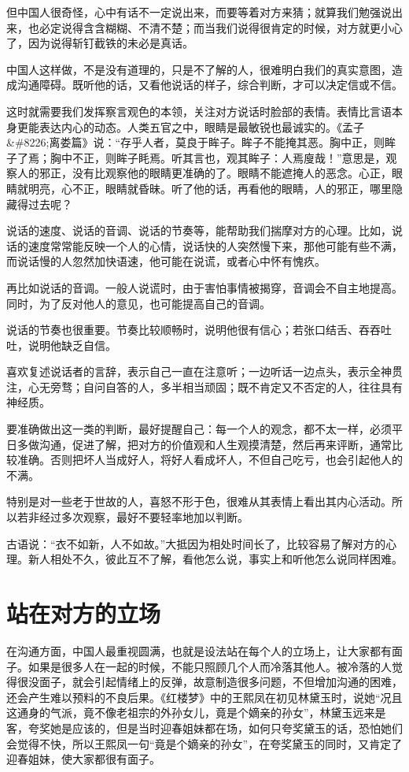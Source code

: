 \documentclass[fontset=fandol, a4paper, 12pt, openright]{ctexbook}
\begin{document}
但中国人很奇怪，心中有话不一定说出来，而要等着对方来猜；就算我们勉强说出来，也必定说得含含糊糊、不清不楚；而当我们说得很肯定的时候，对方就更小心了，因为说得斩钉截铁的未必是真话。

中国人这样做，不是没有道理的，只是不了解的人，很难明白我们的真实意图，造成沟通障碍。既听他的话，又看他说话的样子，综合判断，才可以决定信或不信。

这时就需要我们发挥察言观色的本领，关注对方说话时脸部的表情。表情比言语本身更能表达内心的动态。人类五官之中，眼睛是最敏锐也最诚实的。《孟子\&\#8226;离娄篇》说：“存乎人者，莫良于眸子。眸子不能掩其恶。胸中正，则眸子了焉；胸中不正，则眸子眊焉。听其言也，观其眸子：人焉廋哉！”意思是，观察人的邪正，没有比观察他的眼睛更准确的了。眼睛不能遮掩人的恶念。心正，眼睛就明亮，心不正，眼睛就昏昧。听了他的话，再看他的眼睛，人的邪正，哪里隐藏得过去呢？

说话的速度、说话的音调、说话的节奏等，能帮助我们揣摩对方的心理。比如，说话的速度常常能反映一个人的心情，说话快的人突然慢下来，那他可能有些不满，而说话慢的人忽然加快语速，他可能在说谎，或者心中怀有愧疚。

再比如说话的音调。一般人说谎时，由于害怕事情被揭穿，音调会不自主地提高。同时，为了反对他人的意见，也可能提高自己的音调。

说话的节奏也很重要。节奏比较顺畅时，说明他很有信心；若张口结舌、吞吞吐吐，说明他缺乏自信。

喜欢复述说话者的言辞，表示自己一直在注意听；一边听话一边点头，表示全神贯注，心无旁骛；自问自答的人，多半相当顽固；既不肯定又不否定的人，往往具有神经质。

要准确做出这一类的判断，最好提醒自己：每一个人的观念，都不太一样，必须平日多做沟通，促进了解，把对方的价值观和人生观摸清楚，然后再来评断，通常比较准确。否则把坏人当成好人，将好人看成坏人，不但自己吃亏，也会引起他人的不满。

特别是对一些老于世故的人，喜怒不形于色，很难从其表情上看出其内心活动。所以若非经过多次观察，最好不要轻率地加以判断。

古语说：“衣不如新，人不如故。”大抵因为相处时间长了，比较容易了解对方的心理。新人相处不久，彼此互不了解，看他怎么说，事实上和听他怎么说同样困难。

\section{站在对方的立场}

在沟通方面，中国人最重视圆满，也就是设法站在每个人的立场上，让大家都有面子。如果是很多人在一起的时候，不能只照顾几个人而冷落其他人。被冷落的人觉得很没面子，就会引起情绪上的反弹，故意制造很多问题，不但增加沟通的困难，还会产生难以预料的不良后果。《红楼梦》中的王熙凤在初见林黛玉时，说她“况且这通身的气派，竟不像老祖宗的外孙女儿，竟是个嫡亲的孙女”，林黛玉远来是客，夸奖她是应该的，但是当时迎春姐妹都在场，如何只夸奖黛玉的话，恐怕她们会觉得不快，所以王熙凤一句“竟是个嫡亲的孙女”，在夸奖黛玉的同时，又肯定了迎春姐妹，使大家都很有面子。
\end{document}

